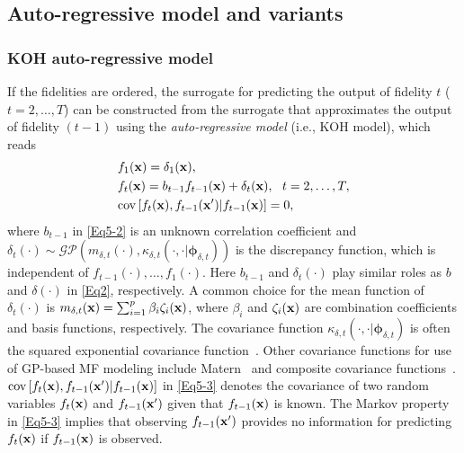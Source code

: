 \documentclass[iicol,sn-basic]{sn-jnl}%
\begin{document}
\subsection{Auto-regressive model and variants}\label{Sec42}

\subsubsection{KOH auto-regressive model}\label{Sec421}

If the fidelities are ordered, the surrogate for predicting the output of fidelity $t$ ($t=2,\dots,T$) can be constructed from the surrogate that approximates the output of fidelity $(t-1)$ using the \textit{auto-regressive model} (i.e., KOH model), which reads~\citep{Kennedy2000}
\begin{subequations}\label{Eq5}
	\begin{align}
		& f_1({\bf x}) = \delta_{1}({\bf x}), \label{Eq5-1}\\
		& f_t({\bf x}) =
		 b_{t-1} f_{t-1}({\bf x}) + \delta_{t}({\bf x}), \ \  t=2,\dots,T \label{Eq5-2},\\
		& \text{cov}\left[f_{t}({\bf x}),f_{t-1}({\bf x}')|f_{t-1}({\bf x})\right]=0 
		\label{Eq5-3},
	\end{align}
\end{subequations}
where $b_{t-1}$ in \cref{Eq5-2} is an unknown correlation coefficient and $\delta_{t}(\cdot) \sim \mathcal{GP}\left(m_{\delta,t}(\cdot),\kappa_{\delta,t}(\cdot,\cdot|{\boldsymbol \phi}_{\delta,t})\right)$ is the discrepancy function, which is independent of $f_{t-1}(\cdot),\dots,f_{1}(\cdot)$.
Here $b_{t-1}$ and $\delta_{t}(\cdot)$ play similar roles as $b$ and $\delta(\cdot)$ in \cref{Eq2}, respectively.
A common choice for the mean function of $\delta_{t}(\cdot)$ is $m_{\delta,t}({\bf x})=\sum_{i=1}^p \beta_i \zeta_i({\bf x})$, where $\beta_i$ and  $\zeta_i({\bf x})$ are combination coefficients and basis functions, respectively.
The covariance function $\kappa_{\delta,t}(\cdot,\cdot|{\boldsymbol \phi}_{\delta,t})$ is often the squared exponential covariance function~\citep{Kennedy2000,Forrester2008}.
Other covariance functions for use of GP-based MF modeling include Matern~\citep{Pang2017} and composite covariance functions~\citep{Palar2023}. 
$\text{cov}\left[f_{t}({\bf x}),f_{t-1}({\bf x}')|f_{t-1}({\bf x})\right]$ in \cref{Eq5-3} denotes the covariance of two random variables $f_{t}({\bf x})$ and $f_{t-1}({\bf x}')$ given that $f_{t-1}({\bf x})$ is known. 
The Markov property in \cref{Eq5-3} implies that observing $f_{t-1}({\bf x}')$ provides no information for predicting $f_{t}({\bf x})$ if $f_{t-1}({\bf x})$ is observed.
 
\end{document}
